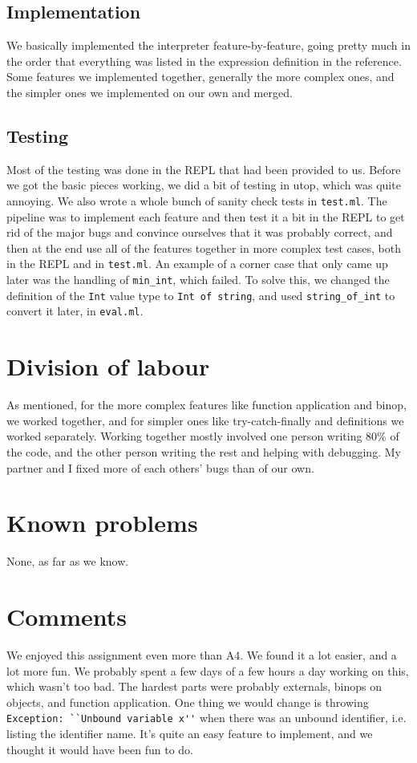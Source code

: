 \subsection{Implementation}
We basically implemented the interpreter feature-by-feature, going pretty much in the order that everything was listed in the expression definition in the reference. Some features we implemented together, generally the more complex ones, and the simpler ones we implemented on our own and merged.

\subsection{Testing}
Most of the testing was done in the REPL that had been provided to us. Before we got the basic pieces working, we did a bit of testing in utop, which was quite annoying. We also wrote a whole bunch of sanity check tests in \lstinline{test.ml}. The pipeline was to implement each feature and then test it a bit in the REPL to get rid of the major bugs and convince ourselves that it was probably correct, and then at the end use all of the features together in more complex test cases, both in the REPL and in \lstinline{test.ml}. An example of a corner case that only came up later was the handling of \lstinline{min_int}, which failed. To solve this, we changed the definition of the \lstinline{Int} value type to \lstinline{Int of string}, and used \lstinline{string_of_int} to convert it later, in \lstinline{eval.ml}.

\section{Division of labour}
As mentioned, for the more complex features like function application and binop, we worked together, and for simpler ones like try-catch-finally and definitions we worked separately. Working together mostly involved one person writing 80\% of the code, and the other person writing the rest and helping with debugging. My partner and I fixed more of each others' bugs than of our own.

\section{Known problems}
None, as far as we know.

\section{Comments}
We enjoyed this assignment even more than A4. We found it a lot easier, and a lot more fun. We probably spent a few days of a few hours a day working on this, which wasn't too bad. The hardest parts were probably externals, binops on objects, and function application. One thing we would change is throwing \lstinline{Exception: ``Unbound variable x''} when there was an unbound identifier, i.e. listing the identifier name. It's quite an easy feature to implement, and we thought it would have been fun to do.


